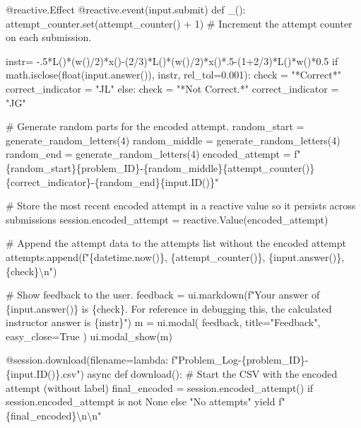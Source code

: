 \documentclass[
  letterpaper,
  DIV=11,
  numbers=noendperiod]{scrreprt}
\newenvironment{Shaded}{\begin{snugshade}}{\end{snugshade}}
\newcommand{\NormalTok}[1]{\textcolor[rgb]{0.00,0.23,0.31}{#1}}
\begin{document}
\begin{Shaded}
\begin{Highlighting}[]
\NormalTok{    @reactive.Effect}
\NormalTok{    @reactive.event(input.submit)}
\NormalTok{    def \_():}
\NormalTok{        attempt\_counter.set(attempt\_counter() + 1)  \# Increment the attempt counter on each submission.}
        
\NormalTok{        instr= {-}.5*L()*(w()/2)*x(){-}(2/3)*L()*(w()/2)*x()*.5{-}(1+2/3)*L()*w()*0.5}
\NormalTok{        if math.isclose(float(input.answer()), instr, rel\_tol=0.001):}
\NormalTok{            check = "*Correct*"}
\NormalTok{            correct\_indicator = "JL"}
\NormalTok{        else:}
\NormalTok{            check = "*Not Correct.*"}
\NormalTok{            correct\_indicator = "JG"}

\NormalTok{        \# Generate random parts for the encoded attempt.}
\NormalTok{        random\_start = generate\_random\_letters(4)}
\NormalTok{        random\_middle = generate\_random\_letters(4)}
\NormalTok{        random\_end = generate\_random\_letters(4)}
\NormalTok{        encoded\_attempt = f"\{random\_start\}\{problem\_ID\}{-}\{random\_middle\}\{attempt\_counter()\}\{correct\_indicator\}{-}\{random\_end\}\{input.ID()\}"}

\NormalTok{        \# Store the most recent encoded attempt in a reactive value so it persists across submissions}
\NormalTok{        session.encoded\_attempt = reactive.Value(encoded\_attempt)}

\NormalTok{        \# Append the attempt data to the attempts list without the encoded attempt}
\NormalTok{        attempts.append(f"\{datetime.now()\}, \{attempt\_counter()\}, \{input.answer()\}, \{check\}\textbackslash{}n")}

\NormalTok{        \# Show feedback to the user.}
\NormalTok{        feedback = ui.markdown(f"Your answer of \{input.answer()\} is \{check\}. For reference in debugging this, the calculated instructor answer is \{instr\}")}
\NormalTok{        m = ui.modal(}
\NormalTok{            feedback,}
\NormalTok{            title="Feedback",}
\NormalTok{            easy\_close=True}
\NormalTok{        )}
\NormalTok{        ui.modal\_show(m)}

\NormalTok{    @session.download(filename=lambda: f"Problem\_Log{-}\{problem\_ID\}{-}\{input.ID()\}.csv")}
\NormalTok{    async def download():}
\NormalTok{        \# Start the CSV with the encoded attempt (without label)}
\NormalTok{        final\_encoded = session.encoded\_attempt() if session.encoded\_attempt is not None else "No attempts"}
\NormalTok{        yield f"\{final\_encoded\}\textbackslash{}n\textbackslash{}n"}
        

\end{Highlighting}
\end{Shaded}
\end{document}
